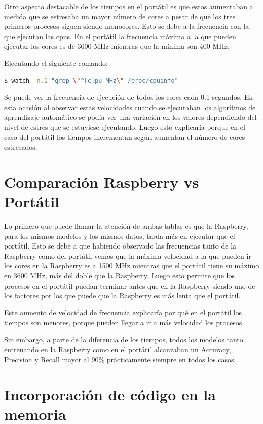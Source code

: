 \documentclass[a4paper, 12pt]{book}
\begin{document}
Otro aspecto destacable de los tiempos en el portátil es que estos aumentaban a medida que se estresaba un mayor número de cores a pesar de que los tres primeros procesos siguen siendo monocores. Esto se debe a la frecuencia con la que ejecutan las cpus. En el portátil la frecuencia máxima a la que pueden ejecutar los cores es de 3600 MHz mientras que la mínima son 400 MHz. 

Ejecutando el siguiente comando: 

\begin{lstlisting}[language=bash, showstringspaces=false]
  $ watch -n.1 "grep \"^[c]pu MHz\" /proc/cpuinfo"
\end{lstlisting}

Se puede ver la frecuencia de ejecución de todos los cores cada 0.1 segundos. En esta ocasión al observar estas velocidades cuando se ejecutaban los algoritmos de aprendizaje automático se podía ver una variación en los valores dependiendo del nivel de estrés que se estuviese ejecutando. Luego esto explicaría porque en el caso del portátil los tiempos incrementan según aumentan el número de cores estresados. 

\section{Comparación Raspberry vs Portátil}
\label{sec:raspberry_vs_portatil}

Lo primero que puede llamar la atención de ambas tablas es que la Raspberry, para los mismos modelos y los mismos datos, tarda más en ejecutar que el portátil. Esto se debe a que habiendo observado las frecuencias tanto de la Raspberry como del portátil vemos que la máxima velocidad a la que pueden ir los cores en la Raspberry es a 1500 MHz mientras que el portátil tiene su máximo en 3600 MHz, más del doble que la Raspberry. Luego esto permite que los procesos en el portátil puedan terminar antes que en la Raspberry siendo uno de los factores por los que puede que la Raspberry es más lenta que el portátil.

Este aumento de velocidad de frecuencia explicaría por qué en el portátil los tiempos son menores, porque pueden llegar a ir a más velocidad los procesos.

Sin embargo, a parte de la diferencia de los tiempos, todos los modelos tanto entrenando en la Raspberry como en el portátil alcanzaban un Accuracy, Precision y Recall mayor al 90\% prácticamente siempre en todos los casos.
 
\section{Incorporación de código en la memoria}
\end{document}
